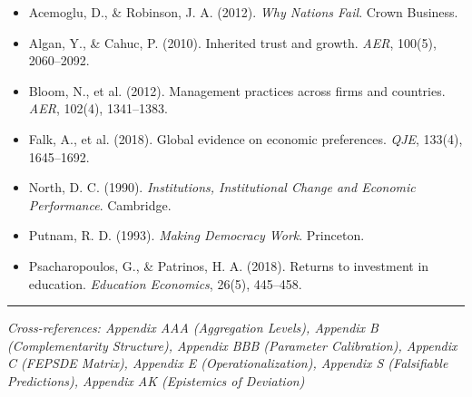 \begin{itemize}[nosep]
    \item Acemoglu, D., \& Robinson, J. A. (2012). \textit{Why Nations Fail}. Crown Business.
    \item Algan, Y., \& Cahuc, P. (2010). Inherited trust and growth. \textit{AER}, 100(5), 2060--2092.
    \item Bloom, N., et al. (2012). Management practices across firms and countries. \textit{AER}, 102(4), 1341--1383.
    \item Falk, A., et al. (2018). Global evidence on economic preferences. \textit{QJE}, 133(4), 1645--1692.
    \item North, D. C. (1990). \textit{Institutions, Institutional Change and Economic Performance}. Cambridge.
    \item Putnam, R. D. (1993). \textit{Making Democracy Work}. Princeton.
    \item Psacharopoulos, G., \& Patrinos, H. A. (2018). Returns to investment in education. \textit{Education Economics}, 26(5), 445--458.
\end{itemize}

\vspace{1em}
\hrule
\vspace{0.5em}
\noindent\textit{Cross-references: Appendix AAA (Aggregation Levels), 
Appendix B (Complementarity Structure), Appendix BBB (Parameter Calibration),
Appendix C (FEPSDE Matrix), Appendix E (Operationalization), 
Appendix S (Falsifiable Predictions), Appendix AK (Epistemics of Deviation)}

